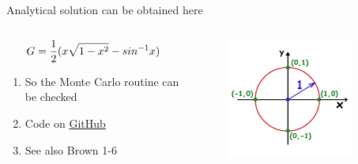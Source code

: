 \documentclass[aspectratio=1610,pdftex,dvipsnames,compress,xcolor={dvipsnames}]{beamer}
\begin{document}
\begin{frame}{Analytical solution can be obtained here}
    \begin{columns}[t]

        \begin{column}{0.55\textwidth}
            \begin{equation}
                \LARGE
                G = \frac{1}{2}(x\sqrt{1-x^2}-sin^{-1} x)
            \end{equation}

            \vspace*{\fill}
            
            \begin{enumerate}[series=outerlist,topsep=0pt,itemsep=21pt,leftmargin=*,label=(\arabic*)]
                \item[]So the Monte Carlo routine can be checked
                \item[]Code on \href{https://github.com/TheDoctorRAB/education/blob/master/src/monte.carlo.simple.py}{GitHub}
                \item[]See also Brown 1-6
            \end{enumerate}
        \end{column}

        \begin{column}{0.45\textwidth}
            \begin{figure}
                \centering
                \includegraphics[width=0.85\textwidth]{circle.png}
            \end{figure}
        \end{column}

    \end{columns}
\end{frame}
\end{document}
